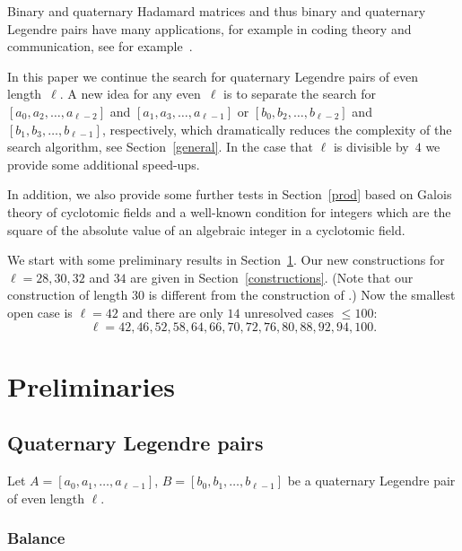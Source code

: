 \documentclass{article}
\theoremstyle{definition}
\newcommand{\commA}[2][]{\todo[#1,color=magenta]{A: #2}}
\begin{document}
Binary and quaternary Hadamard matrices and thus binary and quaternary Legendre pairs have many applications, for example in coding theory and communication, see for example~\cite{h07}.

In this paper we continue the search for quaternary Legendre pairs of even length~$\ell$. 
A new idea for any even~$\ell$ is to separate the search for $[a_0,a_2,\ldots,a_{\ell-2}]$ and $[a_1,a_3,\ldots,a_{\ell-1}]$
or $[b_0,b_2,\ldots,b_{\ell-2}]$ and $[b_1,b_3,\ldots,b_{\ell-1}]$, respectively, which dramatically reduces the complexity of the search algorithm, see Section~\ref{general}.
In the case that $\ell$ is divisible by~$4$ we provide some additional speed-ups.


In addition, we also provide some further tests in Section~\ref{prod} based on Galois theory of cyclotomic fields and a well-known condition  %
for integers which are the square of the absolute value of an algebraic integer in a cyclotomic field.

We start with some preliminary results in Section~\ref{prel}. 
Our new constructions for $\ell=28,30,32$ and $34$ are given in Section~\ref{constructions}.
(Note that our construction of length $30$ is different from the construction of \cite{jp24}.)
Now the smallest open case is $\ell=42$ and there are only $14$ unresolved cases $\le 100$:
$$\ell=42,46,52,58,64,66,70,72,76,80,88,92,94,100.$$


\section{Preliminaries}\label{prel}
\subsection{Quaternary Legendre pairs}
Let $A=[a_0,a_1,\ldots,a_{\ell-1}]$, $B=[b_0,b_1,\ldots,b_{\ell-1}]$
be a quaternary Legendre pair of even length $\ell$.

\subsubsection*{Balance}
\end{document}

